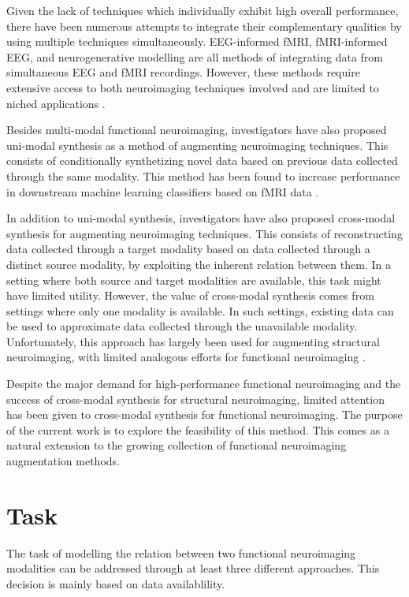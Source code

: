 \documentclass{article}
\begin{document}
Given the lack of techniques which individually exhibit high overall performance, there have been numerous attempts to integrate their complementary qualities by using multiple techniques simultaneously. EEG-informed fMRI, fMRI-informed EEG, and neurogenerative modelling are all methods of integrating data from simultaneous EEG and fMRI recordings. However, these methods require extensive access to both neuroimaging techniques involved and are limited to niched applications \cite{huster_methods_2012}. 

Besides multi-modal functional neuroimaging, investigators have also proposed uni-modal synthesis as a method of augmenting neuroimaging techniques. This consists of conditionally synthetizing novel data based on previous data collected through the same modality. This method has been found to increase performance in downstream machine learning classifiers based on fMRI data \cite{zhuang_fmri_2019}.

In addition to uni-modal synthesis, investigators have also proposed cross-modal synthesis for augmenting neuroimaging techniques. This consists of reconstructing data collected through a target modality based on data collected through a distinct source modality, by exploiting the inherent relation between them. In a setting where both source and target modalities are available, this task might have limited utility. However, the value of cross-modal synthesis comes from settings where only one modality is available. In such settings, existing data can be used to approximate data collected through the unavailable modality. Unfortunately, this approach has largely been used for augmenting structural neuroimaging, with limited analogous efforts for functional neuroimaging \cite{yi_generative_2019}.

Despite the major demand for high-performance functional neuroimaging and the success of cross-modal synthesis for structural neuroimaging, limited attention has been given to cross-modal synthesis for functional neuroimaging. The purpose of the current work is to explore the feasibility of this method. This comes as a natural extension to the growing collection of functional neuroimaging augmentation methods.

\section{Task}

The task of modelling the relation between two functional neuroimaging modalities can be addressed through at least three different approaches. This decision is mainly based on data availablility.
\end{document}
